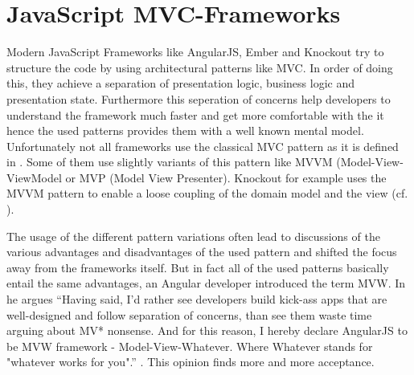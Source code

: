 \section{JavaScript MVC-Frameworks}

Modern JavaScript Frameworks like AngularJS, Ember and Knockout try to structure the code by using architectural patterns like MVC.
In order of doing this, they achieve a separation of presentation logic, business logic and presentation state.
Furthermore this seperation of concerns help developers to understand the framework much faster and get more comfortable with the it hence the used patterns provides them with a well known mental model.
Unfortunately not all frameworks use the classical MVC pattern as it is defined in \autocite[]{smalltalk_mvc}.
Some of them use slightly variants of this pattern like MVVM (Model-View-ViewModel or MVP (Model View Presenter).
Knockout for example uses the MVVM pattern to enable a loose coupling of the domain model and the view (cf.
\autocite{heise_knockout}).
 
The usage of the different pattern variations often lead to discussions of the various advantages and disadvantages of the used pattern and shifted the focus away from the frameworks itself.
But in fact all of the used patterns basically entail the same advantages, an Angular developer introduced the term MVW.
In he argues \enquote{Having said, I'd rather see developers build kick-ass apps that are well-designed and follow separation of concerns, than see them waste time arguing about MV* nonsense.
And for this reason, I hereby declare AngularJS to be MVW framework - Model-View-Whatever.
Where Whatever stands for "whatever works for you".} \autocite[]{anguler_mvw}.
This opinion finds more and more acceptance.

